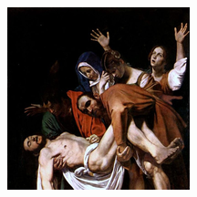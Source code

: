 \begin{figure}[htb]
{  \includegraphics[width=.24\textwidth]{figs/thumbs/caravaggio/18}}\hfill {} \\
\end{figure}



